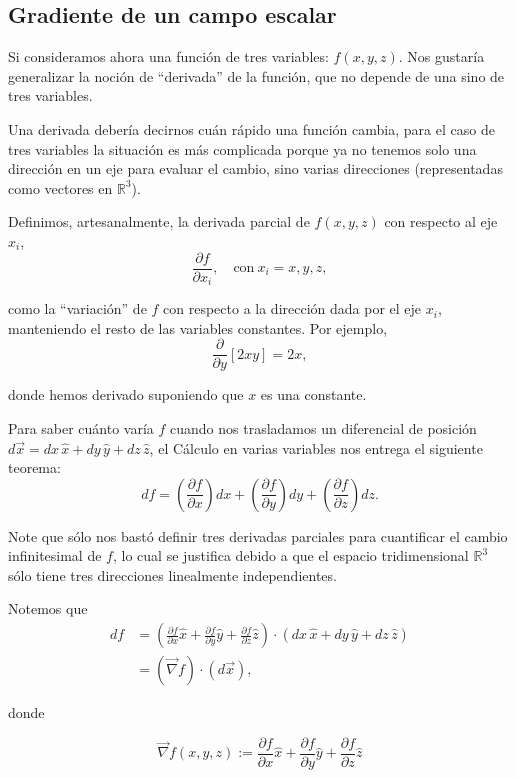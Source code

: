 \subsection*{Gradiente de un campo escalar}

Si consideramos ahora una función de tres variables: $f(x,y,z)$. Nos gustaría generalizar la noción de “derivada” de la función, que no depende de una sino de tres variables.

Una derivada debería decirnos cuán rápido una función cambia, para el caso de tres variables la situación es más complicada porque ya no tenemos solo una dirección en un eje para evaluar el cambio, sino varias direcciones (representadas como vectores en $\mathbb{R}^3$). 

Definimos, artesanalmente, la derivada parcial de $f(x,y,z)$ con respecto al eje $x_i$,
$$\frac{\partial f}{\partial x_i}, \quad \text{con} ~ x_i = x,y,z,$$

como la “variación” de $f$ con respecto a la dirección dada por el eje $x_i$, manteniendo el resto de las variables constantes. Por ejemplo, 
$$\frac{\partial}{\partial y}[2xy] = 2x,$$

donde hemos derivado suponiendo que $x$ es una constante.

Para saber cuánto varía $f$ cuando nos trasladamos un diferencial de posición $d\Vec{x} = dx \, \hat{x} + dy \,\hat{y} + dz \,\hat{z}$, el Cálculo en varias variables nos entrega el siguiente teorema:
$$df = \left(\frac{\partial f}{\partial x}\right) dx + \left(\frac{\partial f}{\partial y}\right) dy +\left(\frac{\partial f}{\partial z}\right) dz.$$

Note que sólo nos bastó definir tres derivadas parciales para cuantificar el cambio infinitesimal de $f$, lo cual se justifica debido a que el espacio tridimensional $\mathbb{R}^3$ sólo tiene tres direcciones linealmente independientes.

Notemos que 
\begin{align*}
    df &= \left( \frac{\partial f}{\partial x} \hat{x} +  \frac{\partial f}{\partial y} \hat{y} +  \frac{\partial f}{\partial z} \hat{z}\right)  \cdot (dx \, \hat{x} + dy \, \hat{y} + dz \, \hat{z})\\
    &= (\Vec{\nabla} f) \cdot (d\Vec{x}),
\end{align*}

donde 
\begin{shaded}
$$\vec{\nabla}f(x,y,z) := \frac{\partial f}{\partial x} \hat{x} + \frac{\partial f}{\partial y} \hat{y} +  \frac{\partial f}{\partial z} \hat{z}$$
\end{shaded}

